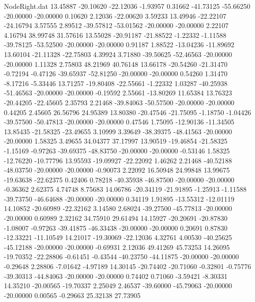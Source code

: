 \begin{filecontents}{NodeRight.dat}
  13.45887  -20.10620  -22.12036    -1.93957    0.31662  -41.73125  -55.66250  -20.00000  -20.00000    0.10620    2.12036  -22.00620    3.59233
  13.49946  -22.22107  -24.16794     3.57555    2.89512  -39.57812  -53.01562  -20.00000  -20.00000    2.22107    4.16794   38.99748   31.57616
  13.55028  -20.91187  -21.88522    -1.22332   -1.11588  -39.78125  -53.52500  -20.00000  -20.00000    0.91187    1.88522  -13.04236  -11.89692
  13.60104  -21.11328  -22.75803     4.39924    3.71880  -39.50625  -52.46563  -20.00000  -20.00000    1.11328    2.75803   48.21969   40.76148
  13.66178  -20.54260  -21.31470    -0.72194   -0.47126  -39.65937  -52.81250  -20.00000  -20.00000    0.54260    1.31470   -8.17216   -5.33446
  13.71257  -19.80408  -22.55661    -1.22332    1.03287  -40.25938  -51.46563  -20.00000  -20.00000   -0.19592    2.55661  -13.80269   11.65384
  13.76323  -20.44205  -22.45605     2.35793    2.21468  -39.84063  -50.57500  -20.00000  -20.00000    0.44205    2.45605   26.56796   24.95389
  13.80380  -20.47546  -21.75095    -1.18750   -1.04426  -39.57500  -50.47813  -20.00000  -20.00000    0.47546    1.75095  -12.90136  -11.34505
  13.85435  -21.58325  -23.49655     3.10999    3.39649  -38.39375  -48.41563  -20.00000  -20.00000    1.58325    3.49655   34.04377   37.17997
  13.90519  -19.46854  -21.58325    -1.15169   -0.97263  -39.69375  -48.83750  -20.00000  -20.00000   -0.53146    1.58325  -12.76220  -10.77796
  13.95593  -19.09927  -22.22092     1.46262    2.21468  -40.52188  -48.03750  -20.00000  -20.00000   -0.90073    2.22092   16.50948   24.99848
  13.99675  -19.63638  -22.62375     0.42406    0.78218  -40.35938  -46.87500  -20.00000  -20.00000   -0.36362    2.62375    4.74748    8.75683
  14.06786  -20.34119  -21.91895    -1.25913   -1.11588  -39.73750  -46.64688  -20.00000  -20.00000    0.34119    1.91895  -13.55312  -12.01119
  14.10852  -20.60989  -22.32162     3.14580    2.68024  -39.27500  -45.77813  -20.00000  -20.00000    0.60989    2.32162   34.75910   29.61494
  14.15927  -20.20691  -20.87830    -1.08007   -0.97263  -39.41875  -46.33438  -20.00000  -20.00000    0.20691    0.87830  -12.33221  -11.10549
  14.21017  -19.30069  -22.12036     4.32761    4.00530  -40.25625  -45.12188  -20.00000  -20.00000   -0.69931    2.12036   49.41269   45.73253
  14.26095  -19.70352  -22.28806    -0.61451   -0.43544  -40.23750  -44.11875  -20.00000  -20.00000   -0.29648    2.28806   -7.01642   -4.97189
  14.30145  -20.74402  -20.71060    -0.32801   -0.75776  -39.30313  -44.84063  -20.00000  -20.00000    0.74402    0.71060   -3.59421   -8.30331
  14.35210  -20.00565  -19.70337     2.25049    2.46537  -39.60000  -45.79063  -20.00000  -20.00000    0.00565   -0.29663   25.32138   27.73905

\end{filecontents}
